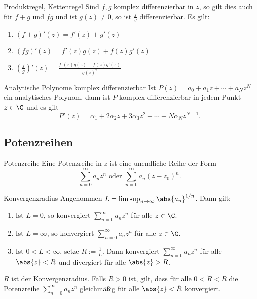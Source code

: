 \begin{karte}{Produktregel, Kettenregel}
    Sind \(f,g\) komplex differenzierbar in \(z\), so gilt dies auch für \(f+g\) und \(fg\) 
    und ist \(g(z) \neq 0\), so ist \(\frac{f}{g}\) differenzierbar. Es gilt: 
    \begin{enumerate}
        \item \((f+g)'(z) = f'(z) + g'(z)\)
        \item \((fg)'(z) = f'(z)g(z) + f(z)g'(z)\)
        \item \( (\frac{f}{g})'(z) = \frac{f'(z) g(z) - f(z) g'(z)}{g(z)^2} \)
    \end{enumerate}
\end{karte}

\begin{karte}{Analytische Polynome komplex differenzierbar}
    Ist \(P(z) = a_0 + a_1 z + \cdots + a_N z^N\) ein analytisches Polynom, dann ist \(P\) komplex differenzierbar 
    in jedem Punkt \(z\in\C\) und es gilt 
    \[ P'(z) = \alpha_1 + 2\alpha_2 z + 3\alpha_3 z^2 + \cdots + N \alpha_N z^{N-1}. \]
\end{karte}

\subsection{Potenzreihen}

\begin{karte}{Potenzreihe}
    Eine Potenzreihe in \(z\) ist eine unendliche Reihe der Form 
    \[ \sum_{n=0}^\infty a_n z^n \text{ oder } \sum_{n=0}^\infty a_n (z - z_0)^n. \]
\end{karte}

\begin{karte}{Konvergenzradius}
    Angenommen \( L = \limsup_{n\rightarrow\infty} \abs{a_n}^{1/n} \). Dann gilt: 
    \begin{enumerate}
        \item Ist \(L = 0\), so konvergiert \( \sum_{n=0}^\infty a_n z^n \) für alle \(z\in \C\).
        \item Ist \( L = \infty \), so konvergiert \( \sum_{n=0}^\infty a_n z^n \) für alle \(z\in \C\).
        \item Ist \( 0 < L < \infty \), setze \(R := \frac{1}{L}\). Dann konvergiert \( \sum_{n=0}^\infty a_n z^n \) für alle \(\abs{z} < R\) 
        und divergiert für alle \(\abs{z} > R\).
    \end{enumerate}
    \(R\) ist der Konvergenzradius. Falls \(R > 0\) ist, gilt, dass für alle \( 0<\tilde{R}<R \) die Potenzreihe 
    \(\sum_{n=0}^\infty a_n z^n\) gleichmäßig für alle \(\abs{z} < \tilde{R}\) konvergiert.
\end{karte}

